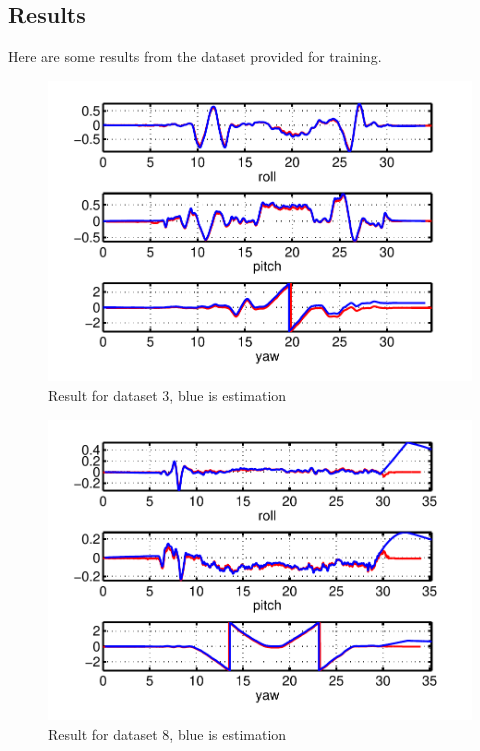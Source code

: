 \documentclass[twoside]{article}
\begin{document}
\begin{multicols}{2}
\section{Results}
Here are some results from the dataset provided for training.
\begin{figure}[H]
\centering
\includegraphics[width=\columnwidth]{fig/data3.pdf} 
\caption{Result for dataset 3, blue is estimation}
\label{fig:data3}
\end{figure}

\begin{figure}[H]
\centering
\includegraphics[width=\columnwidth]{fig/data8.pdf} 
\caption{Result for dataset 8, blue is estimation}
\label{fig:data8}
\end{figure}

\end{multicols}
\end{document}

